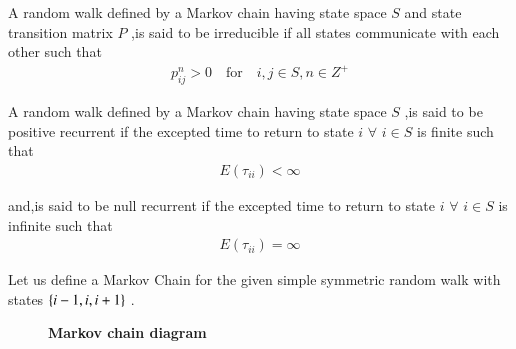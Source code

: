 \documentclass[journal,12pt,twocolumn]{IEEEtran}
\begin{document}
\begin{definition}[Irreducibility]
A random walk defined by a Markov chain having state space $S$ and state transition matrix $P$ ,is said to be irreducible if all states communicate with each other such that
\begin{align}
    p^n_{ij}>0 \quad \text{for} \quad i,j \in S,n \in Z^+
\end{align}
\end{definition}

\begin{definition}
A random walk defined by a Markov chain having state space $S$ ,is said to be positive recurrent if the excepted time to return to state $i$ $\forall$ $i \in S$ is finite such that
\begin{align}
    E(\tau_{ii}) < \infty
\end{align}

and,is said to be null recurrent if the excepted time to return to state $i$ $\forall$ $i \in S$ is infinite such that
\begin{align}
    E(\tau_{ii}) = \infty
\end{align}
\end{definition}

Let us define a Markov Chain for the given simple symmetric random walk with states $\left\{i-1,i,i+1\right\}$ .

\begin{figure}[h]
\caption*{\textbf{Markov chain diagram}}
\centering
{}
\end{figure}
\end{document}
